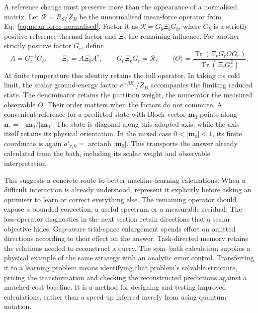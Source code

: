 A reference change must preserve more than the appearance of a normalised matrix. Let $\mathcal R=R_S/Z_B$ be the unnormalised mean-force operator from Eq.~\eqref{eq:mean-force-normalised}. Factor it as $\mathcal R=G_b\Xi_bG_b$, where $G_b$ is a strictly positive reference thermal factor and $\Xi_b$ the remaining influence. For another strictly positive factor $G_r$, define
\begin{equation}
 A=G_r^{-1}G_b,\qquad
 \Xi_r=A\Xi_bA^\dagger,\qquad
 G_r\Xi_rG_r=\mathcal R,\qquad
 \langle O\rangle=
 \frac{\operatorname{Tr}(\Xi_rG_rOG_r)}
      {\operatorname{Tr}(\Xi_rG_r^2)}.
 \label{eq:hmf-reference-transport}
\end{equation}
At finite temperature this identity retains the full operator. In taking its cold limit, the scalar ground-energy factor $e^{-\beta E_0}/Z_B$ accompanies the limiting reduced state. The denominator retains the partition weight, the numerator the measured observable $O$. Their order matters when the factors do not commute. A convenient reference for a predicted state with Bloch vector $\mathbf m_0$ points along $\mathbf n_r=-\mathbf m_0/|\mathbf m_0|$. The state is diagonal along this adapted axis, while the axis itself retains its physical orientation. In the mixed case $0<|\mathbf m_0|<1$, its finite coordinate is again $a'_{r,0}=\operatorname{arctanh}|\mathbf m_0|$. This transports the answer already calculated from the bath, including its scalar weight and observable interpretation.~\cite{McCaul2026e37796}

This suggests a concrete route to better machine-learning calculations. When a difficult interaction is already understood, represent it explicitly before asking an optimiser to learn or correct everything else. The remaining operator should expose a bounded correction, a useful spectrum or a measurable residual. The loss-operator diagnostics in the next section retain directions that a scalar objective hides. Gap-aware trial-space enlargement spends effort on omitted directions according to their effect on the answer. Task-directed memory retains the relations needed to reconstruct a query. The spin--bath calculation supplies a physical example of the same strategy with an analytic error control. Transferring it to a learning problem means identifying that problem's solvable structure, pricing the transformation and checking the reconstructed predictions against a matched-cost baseline. It is a method for designing and testing improved calculations, rather than a speed-up inferred merely from using quantum notation.

